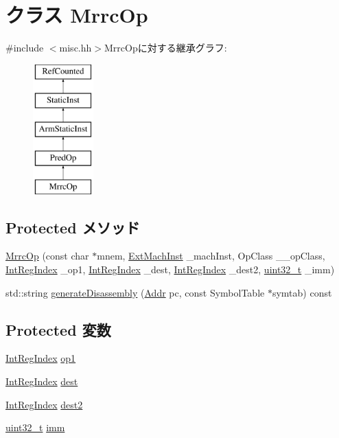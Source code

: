 \hypertarget{classMrrcOp}{
\section{クラス MrrcOp}
\label{classMrrcOp}
}


{\ttfamily \#include $<$misc.hh$>$}MrrcOpに対する継承グラフ:\begin{figure}[H]
\begin{center}
\leavevmode
\includegraphics[height=5cm]{classMrrcOp}
\end{center}
\end{figure}
\subsection*{Protected メソッド}
\begin{DoxyCompactItemize}
\item 
\hyperlink{classMrrcOp_a0c637aed90e17af8765445c08c1d3ca5}{MrrcOp} (const char $\ast$mnem, \hyperlink{classStaticInst_a5605d4fc727eae9e595325c90c0ec108}{ExtMachInst} \_\-machInst, OpClass \_\-\_\-opClass, \hyperlink{namespaceArmISA_ae64680ba9fb526106829d6bf92fc791b}{IntRegIndex} \_\-op1, \hyperlink{namespaceArmISA_ae64680ba9fb526106829d6bf92fc791b}{IntRegIndex} \_\-dest, \hyperlink{namespaceArmISA_ae64680ba9fb526106829d6bf92fc791b}{IntRegIndex} \_\-dest2, \hyperlink{Type_8hh_a435d1572bf3f880d55459d9805097f62}{uint32\_\-t} \_\-imm)
\item 
std::string \hyperlink{classMrrcOp_a95d323a22a5f07e14d6b4c9385a91896}{generateDisassembly} (\hyperlink{classm5_1_1params_1_1Addr}{Addr} pc, const SymbolTable $\ast$symtab) const 
\end{DoxyCompactItemize}
\subsection*{Protected 変数}
\begin{DoxyCompactItemize}
\item 
\hyperlink{namespaceArmISA_ae64680ba9fb526106829d6bf92fc791b}{IntRegIndex} \hyperlink{classMrrcOp_a4c465c43ad568f8bcf8ae71480e9cfea}{op1}
\item 
\hyperlink{namespaceArmISA_ae64680ba9fb526106829d6bf92fc791b}{IntRegIndex} \hyperlink{classMrrcOp_aec72e8e45bdc87abeeeb75d2a8a9a716}{dest}
\item 
\hyperlink{namespaceArmISA_ae64680ba9fb526106829d6bf92fc791b}{IntRegIndex} \hyperlink{classMrrcOp_a0425ad33e25c8198da341b8d8c01fcba}{dest2}
\item 
\hyperlink{Type_8hh_a435d1572bf3f880d55459d9805097f62}{uint32\_\-t} \hyperlink{classMrrcOp_a3aa9e175bd81b38df0e566643d5d4f8d}{imm}
\end{DoxyCompactItemize}


